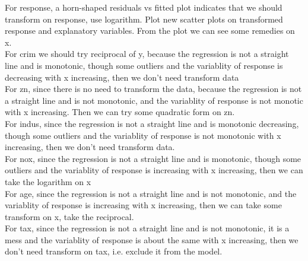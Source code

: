 \documentclass[10pt,letterpaper]{article}
\begin{document}
\begin{enumerate}[leftmargin=0cm,itemindent=.5cm,labelwidth=\itemindent,labelsep=0cm,align=left]
\begin{enumerate}[leftmargin=0cm,itemindent=.5cm,labelwidth=\itemindent,labelsep=0cm,align=left]
\begin{enumerate}[leftmargin=0cm,itemindent=.5cm,labelwidth=\itemindent,labelsep=0cm,align=left]
For response,  a horn-shaped residuals vs fitted plot indicates that we should transform on response, use logarithm. Plot new scatter plots on transformed response and explanatory variables. From the plot we can see some remedies on x. \\
For crim we should try reciprocal of y, because the regression is not a straight line and is monotonic, though some outliers and the variablity of response is decreasing with x increasing, then we don't need transform data\\
For zn, since there is no need to transform the data, because the regression is not a straight line and is not monotonic, and the variablity of response is not monotic with x increasing. Then we can try some quadratic form on zn.\\
For indus, since the regression is not a straight line and is monotonic decreasing, though some outliers and the variablity of response is not monotonic with x increasing, then we don't need transform data.\\
For nox, since the regression is not a straight line and is monotonic, though some outliers and the variablity of response is increasing with x increasing, then we can take the logarithm on x\\
For age, since the regression is not a straight line and is not monotonic, and the variablity of response is increasing with x increasing, then we can take some transform on x, take the reciprocal.\\
For tax, since the regression is not a straight line and is not monotonic, it is a mess and the variablity of response is about the same with x increasing, then we don't need transform on tax, i.e. exclude it from the model.\\
\begin{center}

\end{center}
\end{enumerate}
\end{enumerate}
\end{enumerate}
\end{document}
